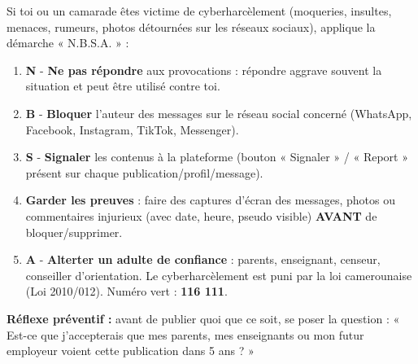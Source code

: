 \documentclass[11pt]{article}
\begin{document}
\begin{methode}
Si toi ou un camarade êtes victime de cyberharcèlement (moqueries, insultes, menaces, rumeurs, photos détournées sur les réseaux sociaux), applique la démarche « N.B.S.A. » :
\begin{enumerate}
\item \textbf{N} - \textbf{Ne pas répondre} aux provocations : répondre aggrave souvent la situation et peut être utilisé contre toi.
\item \textbf{B} - \textbf{Bloquer} l'auteur des messages sur le réseau social concerné (WhatsApp, Facebook, Instagram, TikTok, Messenger).
\item \textbf{S} - \textbf{Signaler} les contenus à la plateforme (bouton « Signaler » / « Report » présent sur chaque publication/profil/message).
\item \textbf{Garder les preuves} : faire des captures d'écran des messages, photos ou commentaires injurieux (avec date, heure, pseudo visible) \textbf{AVANT} de bloquer/supprimer.
\item \textbf{A} - \textbf{Alterter un adulte de confiance} : parents, enseignant, censeur, conseiller d'orientation. Le cyberharcèlement est puni par la loi camerounaise (Loi 2010/012). Numéro vert : \textbf{116 111}.
\end{enumerate}
\textbf{Réflexe préventif :} avant de publier quoi que ce soit, se poser la question : « Est-ce que j'accepterais que mes parents, mes enseignants ou mon futur employeur voient cette publication dans 5 ans ? »
\end{methode}
\end{document}
